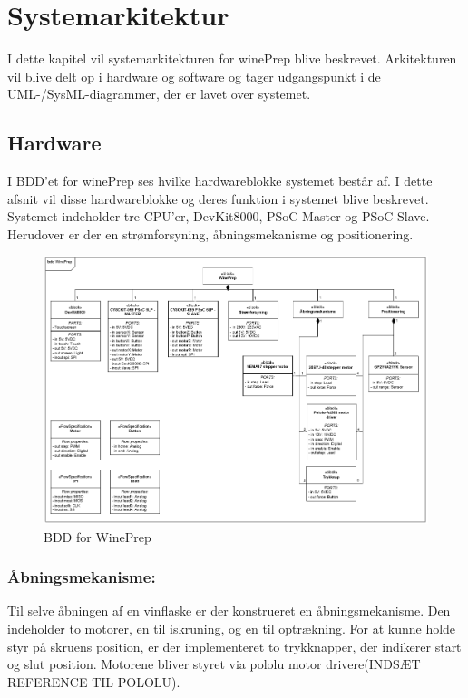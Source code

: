 \section{Systemarkitektur}
I dette kapitel vil systemarkitekturen for winePrep blive beskrevet. Arkitekturen vil blive delt op i hardware og software og tager udgangspunkt 
i de UML-/SysML-diagrammer, der er lavet over systemet. 

\subsection{Hardware}
I BDD'et for winePrep ses hvilke hardwareblokke systemet består af. I dette afsnit vil disse hardwareblokke og deres funktion i systemet blive beskrevet.
Systemet indeholder tre CPU'er, DevKit8000, PSoC-Master og PSoC-Slave. Herudover er der en strømforsyning, åbningsmekanisme og positionering. \\

\begin{figure}[H]
	\includegraphics[scale=0.33]{tex/Arkitektur/Fotos/HW/BDD_winePrep}
	\caption{BDD for WinePrep}
\end{figure}

\subsubsection{Åbningsmekanisme:}
Til selve åbningen af en vinflaske er der konstrueret en åbningsmekanisme. Den indeholder to motorer, en til iskruning, og en til optrækning.
For at kunne holde styr på skruens position, er der implementeret to trykknapper, der indikerer start og slut position. Motorene bliver styret via 
pololu motor drivere(INDSÆT REFERENCE TIL POLOLU). \\   

